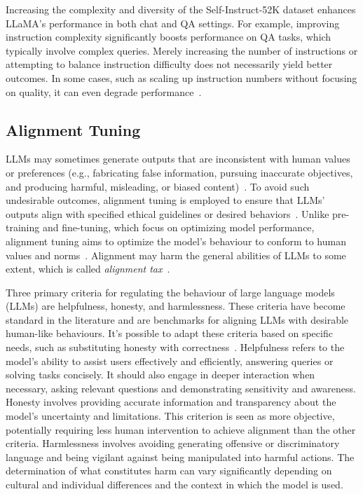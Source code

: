 Increasing the complexity and diversity of the Self-Instruct-52K dataset enhances LLaMA's performance in both chat and QA settings.
For example, improving instruction complexity significantly boosts performance on QA tasks, which typically involve complex queries.
Merely increasing the number of instructions or attempting to balance instruction difficulty does not necessarily yield better outcomes.
In some cases, such as scaling up instruction numbers without focusing on quality, it can even degrade performance~\cite{survey}.

\subsection{Alignment Tuning}
\label{subsec:alignment-tuning}

LLMs may sometimes generate outputs that are inconsistent with human values or preferences (e.g., fabricating false information, pursuing inaccurate objectives, and producing harmful, misleading, or biased content)~\cite{ouyang2022training, kenton2021alignment}.
To avoid such undesirable outcomes, alignment tuning is employed to ensure that LLMs' outputs align with specified ethical guidelines or desired behaviors~\cite{survey}.
Unlike pre-training and fine-tuning, which focus on optimizing model performance, alignment tuning aims to optimize the model's behaviour to conform to human values and norms~\cite{survey}.
Alignment may harm the general abilities of LLMs to some extent, which is called \textit{alignment tax}~\cite{askell2021general}.

Three primary criteria for regulating the behaviour of large language models (LLMs) are helpfulness, honesty, and harmlessness.
These criteria have become standard in the literature and are benchmarks for aligning LLMs with desirable human-like behaviours.
It's possible to adapt these criteria based on specific needs, such as substituting honesty with correctness~\cite{glaese2022improving}.
Helpfulness refers to the model's ability to assist users effectively and efficiently, answering queries or solving tasks concisely.
It should also engage in deeper interaction when necessary, asking relevant questions and demonstrating sensitivity and awareness.
Honesty involves providing accurate information and transparency about the model's uncertainty and limitations.
This criterion is seen as more objective, potentially requiring less human intervention to achieve alignment than the other criteria.
Harmlessness involves avoiding generating offensive or discriminatory language and being vigilant against being manipulated into harmful actions.
The determination of what constitutes harm can vary significantly depending on cultural and individual differences and the context in which the model is used.


